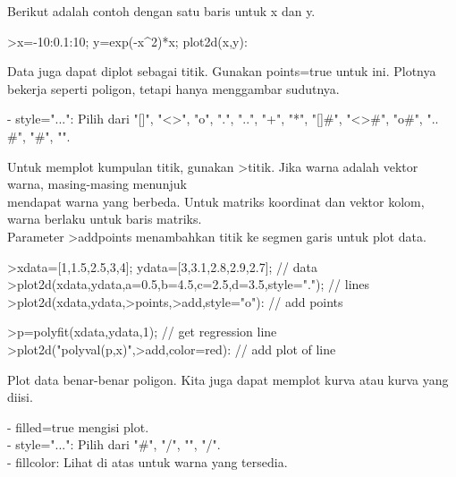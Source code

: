 \documentclass[a4paper,10pt]{article}
\begin{document}
\begin{eulernotebook}
\begin{eulercomment}
\begin{eulercomment}
\begin{eulercomment}
\begin{eulercomment}
\begin{eulercomment}
\begin{eulercomment}
\begin{eulercomment}
\begin{eulercomment}
\begin{eulercomment}
\begin{eulercomment}
\begin{eulercomment}
\begin{eulercomment}
\begin{eulercomment}
\begin{eulercomment}
\begin{eulercomment}
Berikut adalah contoh dengan satu baris untuk x dan y.

\end{eulercomment}
\begin{eulerprompt}
>x=-10:0.1:10; y=exp(-x^2)*x; plot2d(x,y):
\end{eulerprompt}
\begin{eulercomment}
Data juga dapat diplot sebagai titik. Gunakan points=true untuk ini.
Plotnya bekerja seperti poligon, tetapi hanya menggambar sudutnya.

- style="...": Pilih dari "[]", "\textless{}\textgreater{}", "o", ".", "..", "+", "*", "[]#",
"\textless{}\textgreater{}#", "o#", ".. #", "#", "\textbar{}".

Untuk memplot kumpulan titik, gunakan \textgreater{}titik. Jika warna adalah vektor
warna, masing-masing menunjuk\\
mendapat warna yang berbeda. Untuk matriks koordinat dan vektor kolom,
warna berlaku untuk baris matriks.\\
Parameter \textgreater{}addpoints menambahkan titik ke segmen garis untuk plot
data.
\end{eulercomment}
\begin{eulerprompt}
>xdata=[1,1.5,2.5,3,4]; ydata=[3,3.1,2.8,2.9,2.7]; // data
>plot2d(xdata,ydata,a=0.5,b=4.5,c=2.5,d=3.5,style="."); // lines
>plot2d(xdata,ydata,>points,>add,style="o"): // add points
\end{eulerprompt}
\begin{eulerprompt}
>p=polyfit(xdata,ydata,1); // get regression line
>plot2d("polyval(p,x)",>add,color=red): // add plot of line
\end{eulerprompt}
\begin{eulercomment}
Plot data benar-benar poligon. Kita juga dapat memplot kurva atau
kurva yang diisi.

- filled=true mengisi plot.\\
- style="...": Pilih dari "#", "/", "", "/".\\
- fillcolor: Lihat di atas untuk warna yang tersedia.


\end{eulercomment}
\end{eulercomment}
\end{eulercomment}
\end{eulercomment}
\end{eulercomment}
\end{eulercomment}
\end{eulercomment}
\end{eulercomment}
\end{eulercomment}
\end{eulercomment}
\end{eulercomment}
\end{eulercomment}
\end{eulercomment}
\end{eulercomment}
\end{eulercomment}
\end{eulernotebook}
\end{document}
